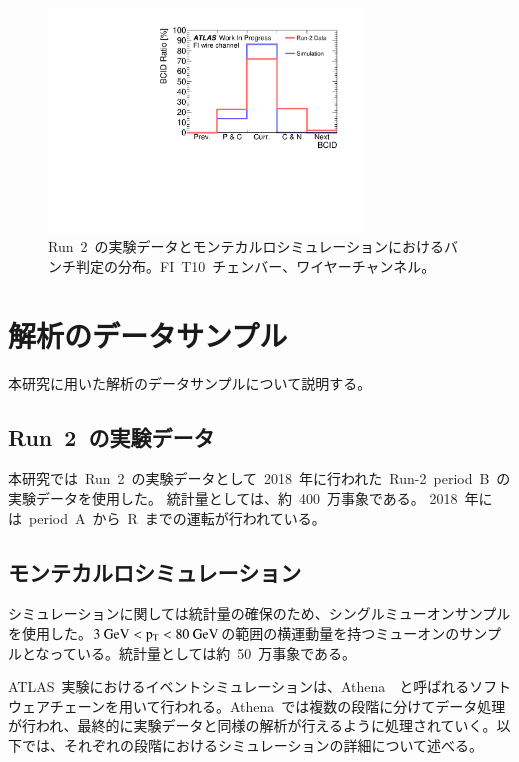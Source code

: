 \begin{figure}[tbp]
        \centering   
        \includegraphics[width=0.75\textwidth,page=1]{img/pdf5/BCID0.pdf}
        \caption[Run~2~の実験データとモンテカルロシミュレーションにおけるバンチ判定の分布]{Run~2~の実験データとモンテカルロシミュレーションにおけるバンチ判定の分布。FI~T10~チェンバー、ワイヤーチャンネル。}
        \label{fig:bcid00}
\end{figure}

\section{解析のデータサンプル}
本研究に用いた解析のデータサンプルについて説明する。

\subsection{Run~2~の実験データ}
本研究では~Run~2~の実験データとして~2018~年に行われた~Run-2~period~B~の実験データを使用した。
統計量としては、約~400~万事象である。
2018~年には~period~A~から~R~までの運転が行われている。

\subsection{モンテカルロシミュレーション}
シミュレーションに関しては統計量の確保のため、シングルミューオンサンプルを使用した。$3~\rm{GeV}<p_{\rm{T}}<80~GeV$の範囲の横運動量を持つミューオンのサンプルとなっている。統計量としては約~50~万事象である。

ATLAS~実験におけるイベントシミュレーションは、Athena~\cite{URL:21}~と呼ばれるソフトウェアチェーンを用いて行われる。Athena~では複数の段階に分けてデータ処理が行われ、最終的に実験データと同様の解析が行えるように処理されていく。以下では、それぞれの段階におけるシミュレーションの詳細について述べる。

